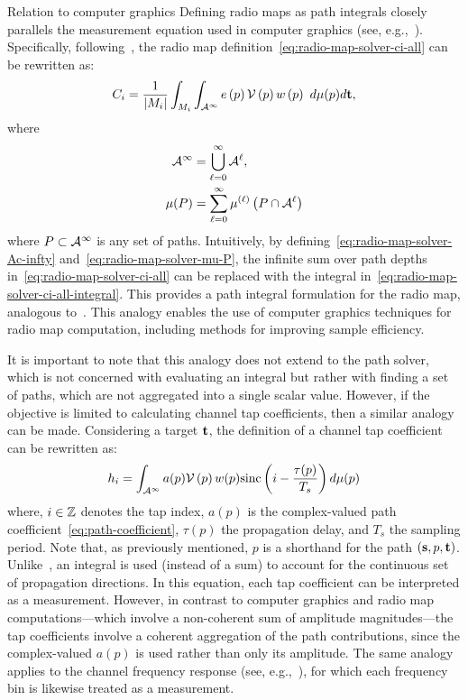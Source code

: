 \begin{highlightbox}{Relation to computer graphics}
    Defining radio maps as path integrals closely parallels the measurement equation used in computer graphics (see, e.g.,~\cite[Eq.~3.18]{Veach:1997:RMC}).
    Specifically, following~\cite[Chapter~8]{Veach:1997:RMC}, the radio map definition~\eqref{eq:radio-map-solver-ci-all} can be rewritten as:
    \begin{equation}
        \label{eq:radio-map-solver-ci-all-integral}
        C_i = \frac{1}{\left| M_i \right|} \int_{M_i} \int_{{\cal A}^{\infty}} e \left( p \right) {\cal V}\left( p \right) w \left( p \right)\ d\mu(p) d\mathbf{t},
    \end{equation}
    where
    \begin{align}
        {\cal A}^{\infty} &= \bigcup_{\ell=0}^{\infty} {\cal A}^{\ell}, \label{eq:radio-map-solver-Ac-infty}\\
        \mu(P) &= \sum_{\ell=0}^{\infty} \mu^{(\ell)}\left( P \cap {\cal A}^{\ell} \right) \label{eq:radio-map-solver-mu-P}
    \end{align}
    where $P \subset {\cal A}^{\infty}$ is any set of paths.
    Intuitively, by defining~\eqref{eq:radio-map-solver-Ac-infty} and~\eqref{eq:radio-map-solver-mu-P}, the infinite sum over path depths in~\eqref{eq:radio-map-solver-ci-all} can be replaced with the integral in~\eqref{eq:radio-map-solver-ci-all-integral}. This provides a path integral formulation for the radio map, analogous to~\cite[Eq.~8.5]{Veach:1997:RMC}. This analogy enables the use of computer graphics techniques for radio map computation, including methods for improving sample efficiency.

    It is important to note that this analogy does not extend to the path solver, which is not concerned with evaluating an integral but rather with finding a set of paths, which are not aggregated into a single scalar value. However, if the objective is limited to calculating channel tap coefficients, then a similar analogy can be made.
    Considering a target $\mathbf{t}$, the definition of a channel tap coefficient~~\cite[Eq.~2.36]{Tse} can be rewritten as:
    \begin{equation}
        h_i = \int_{{\cal A}^{\infty}} a(p) {\cal V}\left( p \right) w(p) \text{sinc}\left( i  - \frac{\tau(p)}{T_s} \right) d\mu(p)
    \end{equation}
    where, $i \in \mathbb{Z}$ denotes the tap index, $a(p)$ is the complex-valued path coefficient~\eqref{eq:path-coefficient}, $\tau(p)$ the propagation delay, and $T_s$ the sampling period.
    Note that, as previously mentioned, $p$ is a shorthand for the path $\left( \mathbf{s}, p, \mathbf{t}\right)$.
    Unlike~\cite[Eq.~2.36]{Tse}, an integral is used (instead of a sum) to account for the continuous set of propagation directions. In this equation, each tap coefficient can be interpreted as a measurement. However, in contrast to computer graphics and radio map computations—which involve a non-coherent sum of amplitude magnitudes—the tap coefficients involve a coherent aggregation of the path contributions, since the complex-valued $a(p)$ is used rather than only its amplitude. The same analogy applies to the channel frequency response (see, e.g.,~\cite[Eq.~3.138]{Tse}), for which each frequency bin is likewise treated as a measurement.
\end{highlightbox}

